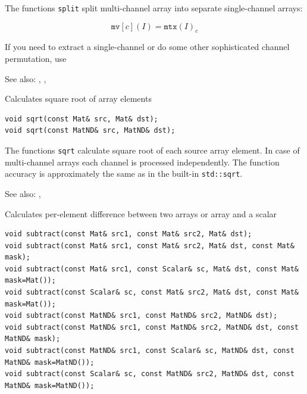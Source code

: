 The functions \texttt{split} split multi-channel array into separate single-channel arrays:

\[ \texttt{mv}[c](I) = \texttt{mtx}(I)_c \]

If you need to extract a single-channel or do some other sophisticated channel permutation, use 

See also: , , 

\label{sqrt}
Calculates square root of array elements

\begin{lstlisting}
void sqrt(const Mat& src, Mat& dst);
void sqrt(const MatND& src, MatND& dst);
\end{lstlisting}
\begin{description}
\end{description}

The functions \texttt{sqrt} calculate square root of each source array element. In case of multi-channel arrays each channel is processed independently. The function accuracy is approximately the same as in the built-in \texttt{std::sqrt}.

See also: , 

\label{subtract}
Calculates per-element difference between two arrays or array and a scalar

\begin{lstlisting}
void subtract(const Mat& src1, const Mat& src2, Mat& dst);
void subtract(const Mat& src1, const Mat& src2, Mat& dst, const Mat& mask);
void subtract(const Mat& src1, const Scalar& sc, Mat& dst, const Mat& mask=Mat());
void subtract(const Scalar& sc, const Mat& src2, Mat& dst, const Mat& mask=Mat());
void subtract(const MatND& src1, const MatND& src2, MatND& dst);
void subtract(const MatND& src1, const MatND& src2, MatND& dst, const MatND& mask);
void subtract(const MatND& src1, const Scalar& sc, MatND& dst, const MatND& mask=MatND());
void subtract(const Scalar& sc, const MatND& src2, MatND& dst, const MatND& mask=MatND());
\end{lstlisting}
\begin{description}
\end{description}

